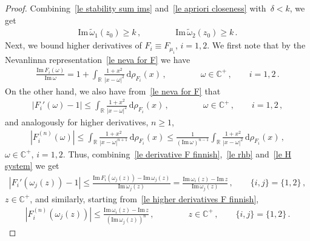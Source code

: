 \documentclass[10pt,reqno]{amsart}
\numberwithin{equation}{section}
\theoremstyle{plain}
\numberwithin{kevin}{section}
\theoremstyle{remark}
\newcommand{\im}{\mathrm{Im}\,}
\newcommand{\R}{{\mathbb R }}
\newcommand{\C}{{\mathbb C}}
\newcommand{\dd}{\mathrm{d}}
\begin{document}
\begin{proof}
 Combining~\eqref{le stability sum ims} and~\eqref{le apriori closeness} with~$\delta<k$, we get
 \begin{align}\label{le stability 2}
  \im \widetilde\omega_1(z_0)\ge k\,,\qquad\qquad \im \widetilde\omega_2(z_0)\ge k\,.
  \end{align}
Next, we bound higher derivatives of $F_i\equiv F_{\mu_i}$, $i=1,2$. We first note that by the Nevanlinna representation~\eqref{le neva for F} we have
\begin{align}\label{le rhb}
 \frac{\im F_i(\omega)}{\im \omega}= 1+\int_\R\frac{1+x^2}{|x-\omega |^2}\,\dd\rho_{F_i}(x)\,,\qquad\qquad \omega\in\C^+\,,\qquad i=1,2\,.
\end{align}
On the other hand, we also have from~\eqref{le neva for F} that
\begin{align}\label{le derivative F finnish}
 |F_i'(\omega)-1|\le\int_\R\frac{1+x^2}{|x-\omega|^2}\,\dd\rho_{F_i}(x)\,,\qquad\qquad \omega\in\C^+\,,\qquad i=1,2\,,
\end{align}
and analogously for higher derivatives, $n\ge 1$,
\begin{align}\label{le higher derivatives F finnish}
 |F_i^{(n)}(\omega)|\le\int_\R\frac{1+x^2}{|x-\omega|^{n+1}}\,\dd\rho_{F_i}(x)\le\frac{1}{(\im \omega)^{n-1}}\int_\R\frac{1+x^2}{|x-\omega|^2}\,\dd\rho_{F_i}(x)\,,
\end{align}
$\omega\in\C^+$, $i=1,2$. Thus, combining~\eqref{le derivative F finnish},~\eqref{le rhb} and~\eqref{le H system} we get
\begin{align}\label{le fbound}
 |F_i'(\omega_j(z))-1|\le\frac{\im F_i(\omega_j(z))-\im \omega_j(z)}{\im \omega_j(z)}=\frac{\im \omega_i(z)-\im z}{\im \omega_j(z)}\,,\qquad \{i,j\}=\{1,2\}\,,
\end{align}
$z\in\C^+$, and similarly, starting from~\eqref{le higher derivatives F finnish}, 
\begin{align}\label{le bound on F derivata}
 |F_i^{(n)}(\omega_j(z))|\le \frac{\im \omega_i(z)-\im z}{(\im \omega_j(z))^{n}}\,,\qquad\qquad z\in\C^+\,,\qquad \{i,j\}=\{1,2\}\,.
\end{align}


\end{proof}
\end{document}
